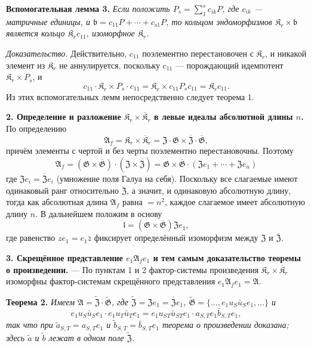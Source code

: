 \documentclass[11pt]{article}
\begin{document}
\noindent\textbf{Вспомогательная лемма 3.} \emph{Если положить \(P_s=\sum_1^s c_{ik}P\), где \(c_{ik}\) --- матричные единицы, и \(\mathfrak b=c_{11}P+\cdots+c_{s1}P\), то кольцом эндоморфизмов \(\mathfrak K_r\times\mathfrak b\) является кольцо \(\mathfrak K_rc_{11}\), изоморфное \(\mathfrak K_r\).}

\noindent\emph{Доказательство.} Действительно, \(c_{11}\) поэлементно перестановочен с \(\mathfrak K_r\), и никакой элемент из \(\mathfrak K_r\) не аннулируется, поскольку \(c_{11}\) --- порождающий идемпотент \(\mathfrak K_r\times P_s\), и
\[
c_{11}\cdot\mathfrak K_r\times P_s\cdot c_{11}
=\mathfrak K_r\times c_{11}P_sc_{11}
=\mathfrak K_rc_{11}.
\]
Из этих вспомогательных лемм непосредственно следует теорема 1.

\noindent\textbf{2. Определение и разложение \(\mathfrak K_r\times\overline{\mathfrak K}_r\) в левые идеалы абсолютной длины \(n\).} По определению
\[
\mathfrak A_f=\mathfrak K_r\times\overline{\mathfrak K}_r
=\mathfrak Z\cdot\mathfrak G\times\overline{\mathfrak Z}\cdot\overline{\mathfrak G},
\]
причём элементы с чертой и без черты поэлементно перестановочны. Поэтому
\[
\mathfrak A_f
=(\mathfrak G\times\overline{\mathfrak G})\cdot(\mathfrak Z\times\overline{\mathfrak Z})
=\mathfrak G\times\overline{\mathfrak G}\cdot(\mathfrak Ze_1+\cdots+\mathfrak Ze_n)
\]
где \(\mathfrak Ze_i=\overline{\mathfrak Z}e_i\) (умножение поля Галуа на себя). Поскольку все слагаемые имеют одинаковый ранг относительно \(\mathfrak Z\), а значит, и одинаковую абсолютную длину, тогда как абсолютная длина \(\mathfrak A_f\) равна \(=n^2\), каждое слагаемое имеет абсолютную длину \(n\). В дальнейшем положим в основу
\[
\mathfrak l=(\mathfrak G\times\overline{\mathfrak G})\mathfrak Ze_1,
\]
где равенство \(ze_1=e_1\bar z\) фиксирует определённый изоморфизм между \(\mathfrak Z\) и \(\overline{\mathfrak Z}\).

\noindent\textbf{3. Скрещённое представление \(e_1\mathfrak A_fe_1\) и тем самым доказательство теоремы о произведении.} --- По пунктам 1 и 2 фактор-системы произведения \(\mathfrak K_r\times\overline{\mathfrak K}_r\) изоморфны фактор-системам скрещённого представления \(e_1\mathfrak A_fe_1=\mathfrak A\).

\noindent\textbf{Теорема 2.} \emph{Имеем \(\mathfrak A=\widetilde{\mathfrak Z}\cdot\widetilde{\mathfrak G}\), где \(\widetilde{\mathfrak Z}=\mathfrak Ze_1=\overline{\mathfrak Z}e_1\), \(\widetilde{\mathfrak G}=\{\ldots,e_1u_S\bar u_Se_1,\ldots\}\) и
\[
e_1u_S\bar u_Se_1\cdot e_1u_T\bar u_Te_1
=e_1u_{ST}\bar u_{ST}e_1\cdot a_{S,T}e_1\bar b_{S,T}e_1,
\]
так что при \(\tilde a_{S,T}=a_{S,T}e_1\) и \(\tilde b_{S,T}=\bar b_{S,T}e_1\) теорема о произведении доказана; здесь \(\tilde a\) и \(\tilde b\) лежат в одном поле \(\widetilde{\mathfrak Z}\).}
\end{document}
